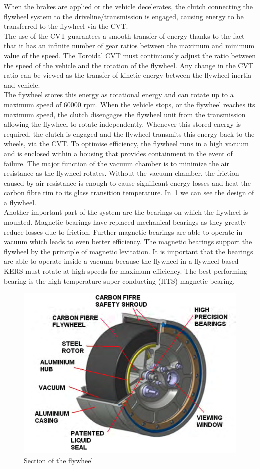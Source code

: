 \documentclass[11pt]{article}
\begin{document}
When the brakes are applied or the vehicle decelerates, the clutch connecting the flywheel system to the driveline/transmission is engaged, causing energy to be transferred to the flywheel via the CVT. \\
The use of the CVT guarantees a smooth transfer of energy thanks to the fact that it has an infinite number of gear ratios between the maximum and minimum value of the speed. The Toroidal CVT must continuously adjust the ratio between the speed of the vehicle and the rotation of the flywheel. Any change in the CVT ratio can be viewed as the transfer of kinetic energy between the flywheel inertia and vehicle.\\
The flywheel stores this energy as rotational energy and can rotate up to a maximum speed of $60000$ rpm. When the vehicle stops, or the flywheel reaches its maximum speed, the clutch disengages the flywheel unit from the transmission allowing the flywheel to rotate independently. Whenever this stored energy is required, the clutch is engaged and the flywheel transmits this energy back to the wheels, via the CVT. To optimise efficiency, the flywheel runs in a high vacuum and is enclosed within a housing that provides containment in the event of failure.
The major function of the vacuum chamber is to minimize the air resistance as the flywheel rotates. Without the vacuum chamber, the friction caused by air resistance is enough to cause significant energy losses and heat the carbon fibre rim to its glass transition temperature. In \figurename\,\ref{fig: Flywheel} we can see the design of a flywheel.\\
Another important part of the system are the bearings on which the flywheel is mounted. Magnetic bearings have replaced mechanical bearings as they greatly reduce losses due to friction. Further magnetic bearings are able to operate in vacuum which leads to even better efficiency. The magnetic bearings support the flywheel by the principle of magnetic levitation. It is important that the bearings are able to operate inside a vacuum because the flywheel in a flywheel-based KERS must rotate at high speeds for maximum efficiency. The best performing bearing is the high-temperature super-conducting (HTS) magnetic bearing.

\begin{figure}[H]
\centering
\includegraphics[width=.6\textwidth]{Images/Flywheel_Components.png}
\caption{Section of the flywheel}
\label{fig: Flywheel}
\end{figure}
\end{document}
